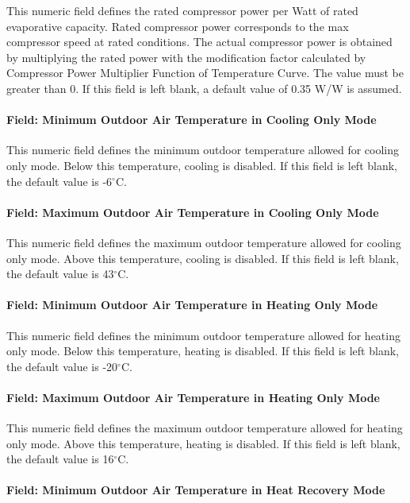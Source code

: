 This numeric field defines the rated compressor power per Watt of rated evaporative capacity. Rated compressor power corresponds to the max compressor speed at rated conditions. The actual compressor power is obtained by multiplying the rated power with the modification factor calculated by Compressor Power Multiplier Function of Temperature Curve. The value must be greater than 0. If this field is left blank, a default value of 0.35 W/W is assumed.

\paragraph{Field: Minimum Outdoor Air Temperature in Cooling Only Mode}

This numeric field defines the minimum outdoor temperature allowed for cooling only mode. Below this temperature, cooling is disabled. If this field is left blank, the default value is -6$^\circ$C.

\paragraph{Field: Maximum Outdoor Air Temperature in Cooling Only Mode}

This numeric field defines the maximum outdoor temperature allowed for cooling only mode. Above this temperature, cooling is disabled. If this field is left blank, the default value is 43$^\circ$C.

\paragraph{Field: Minimum Outdoor Air Temperature in Heating Only Mode}

This numeric field defines the minimum outdoor temperature allowed for heating only mode. Below this temperature, heating is disabled. If this field is left blank, the default value is -20$^\circ$C.

\paragraph{Field: Maximum Outdoor Air Temperature in Heating Only Mode}

This numeric field defines the maximum outdoor temperature allowed for heating only mode. Above this temperature, heating is disabled. If this field is left blank, the default value is 16$^\circ$C.

\paragraph{Field: Minimum Outdoor Air Temperature in Heat Recovery Mode}

